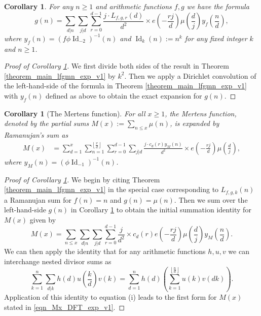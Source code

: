 \documentclass[12pt,reqno,a4letter]{article}
\numberwithin{figure}{section}
\numberwithin{table}{section}
\numberwithin{equation}{section}
\newcommand{\floor}[1]{\left\lfloor #1 \right\rfloor}
\newcommand{\e}[1]{e\left(#1\right)}
\DeclareMathOperator{\Id}{Id}
\theoremstyle{plain}
\newtheorem{cor}[theorem]{Corollary}
\numberwithin{theorem}{section}
\theoremstyle{definition}
\begin{document}
\begin{cor} 
\label{cor_exact_formula_forn_gn} 
For any $n \geq 1$ and arithmetic functions $f,g$ we have the formula 
$$g(n) = \sum_{d|n} \sum_{j|d} \sum_{r=0}^{d-1} \frac{j \cdot L_{f,g,r}(d)}{d^2} \times 
  \e{-\frac{rj}{d}} \mu\left(\frac{d}{j}\right) y_f\left(\frac{n}{d}\right),$$
where $y_f(n) = (f \phi \Id_{-2})^{-1}(n)$ and $\operatorname{Id}_k(n) := n^k$ for any 
fixed integer $k$ and $n \geq 1$.  
\end{cor} 
\begin{proof}[Proof of Corollary \ref{cor_exact_formula_forn_gn}] 
We first divide both sides of the result in 
Theorem \ref{theorem_main_lfgmn_exp_v1} 
by $k^2$. 
Then we apply a Dirichlet convolution of the left-hand-side of the formula in 
Theorem \ref{theorem_main_lfgmn_exp_v1} with 
$y_f(n)$ defined as above to obtain the exact expansion for $g(n)$. 
\end{proof} 

\begin{cor}[The Mertens function] 
\label{cor_Mertens_function_v2} 
For all $x \geq 1$, the Mertens function, denoted by the partial sums 
$M(x) := \sum_{n \leq x} \mu(n)$, is expanded by Ramanujan's sum as 
\begin{align} 
\label{eqn_Mx_DFT_exp_v1} 
M(x) & = \sum_{d=1}^x \sum_{n=1}^{\floor{\frac{x}{d}}} \sum_{r=0}^{d-1} 
     \sum_{j|d} \frac{j \cdot c_d(r) y_M(n)}{d^2} \times \e{-\frac{rj}{d}} 
     \mu\left(\frac{d}{j}\right), 
\end{align} 
where $y_M(n) = (\phi \Id_{-1})^{-1}(n)$. 
\end{cor} 
\begin{proof}[Proof of Corollary \ref{cor_Mertens_function_v2}]
We begin by citing Theorem \ref{theorem_main_lfgmn_exp_v1} 
in the special case corresponding to 
$L_{f,g,k}(n)$ a Ramanujan sum for $f(n) = n$ and $g(n) = \mu(n)$. 
Then we sum over the left-hand-side $g(n)$ in 
Corollary \ref{cor_exact_formula_forn_gn} to obtain the 
initial summation identity for $M(x)$ given by 
\[
\tag{i} 
M(x) = \sum_{n \leq x} \sum_{d|n} \sum_{j|d} 
     \sum_{r=0}^{d-1} \frac{j}{d^2} \times c_d(r) \e{-\frac{rj}{d}} 
     \mu\left(\frac{d}{j}\right) y_M\left(\frac{n}{d}\right). 
\]
We can then apply the identity that for any arithmetic functions $h,u,v$ we can 
interchange nested divisor sums as
\begin{equation} 
\label{eqn_sum_over_divsum_interchange_exp_ident} 
\sum_{k=1}^n \sum_{d|k} h(d) u\left(\frac{k}{d}\right) v(k) = \sum_{d=1}^n h(d) \left( 
     \sum_{k=1}^{\floor{\frac{n}{d}}} u(k) v(dk)\right). 
\end{equation} 
Application of this identity to equation (i) leads to the 
first form for $M(x)$ stated in \eqref{eqn_Mx_DFT_exp_v1}. 
\end{proof} 
\end{document}
